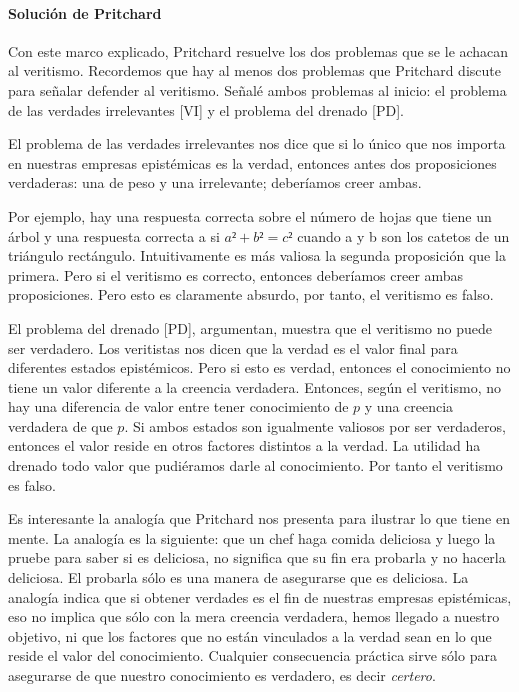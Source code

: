 {{{{\paragraph{Solución de Pritchard}

Con este marco explicado, Pritchard resuelve los dos problemas que se le achacan al veritismo.
Recordemos que hay al menos dos problemas que Pritchard discute para señalar defender al veritismo.
Señalé ambos problemas al inicio: el problema de las verdades irrelevantes [VI] y el problema del drenado [PD].

El problema de las verdades irrelevantes nos dice que si lo único que nos importa en nuestras empresas epistémicas es la verdad, entonces antes dos proposiciones verdaderas: una de peso y una irrelevante; deberíamos creer ambas.

Por ejemplo, hay una respuesta correcta sobre el número de hojas que tiene un árbol y una respuesta correcta a si $a² + b² = c²$ cuando a y b son los catetos de un triángulo rectángulo.
Intuitivamente es más valiosa la segunda proposición que la primera.
Pero si el veritismo es correcto, entonces deberíamos creer ambas proposiciones.
Pero esto es claramente absurdo, por tanto, el veritismo es falso.

El problema del drenado [PD], argumentan, muestra que el veritismo no puede ser verdadero.
Los veritistas nos dicen que la verdad es el valor final para diferentes estados epistémicos.
Pero si esto es verdad, entonces el conocimiento no tiene un valor diferente a la creencia verdadera.
Entonces, según el veritismo, no hay una diferencia de valor entre tener conocimiento de $p$ y una creencia verdadera de que $p$.
Si ambos estados son igualmente valiosos por ser verdaderos, entonces el valor reside en otros factores distintos a la verdad.
La utilidad ha drenado todo valor que pudiéramos darle al conocimiento.
Por tanto el veritismo es falso.

Es interesante la analogía que Pritchard nos presenta para ilustrar lo que tiene en mente.
La analogía es la siguiente: que un chef haga comida deliciosa y luego la pruebe para saber si es deliciosa, no significa que su fin era probarla y no hacerla deliciosa.
El probarla sólo es una manera de asegurarse que es deliciosa.
La analogía indica que si obtener verdades es el fin de nuestras empresas epistémicas, eso no implica que sólo con la mera creencia verdadera, hemos llegado a nuestro objetivo, ni que los factores que no están vinculados a la verdad sean en lo que reside el valor del conocimiento.
Cualquier consecuencia práctica sirve sólo para asegurarse de que nuestro conocimiento es verdadero, es decir \emph{certero}.

}}}}
